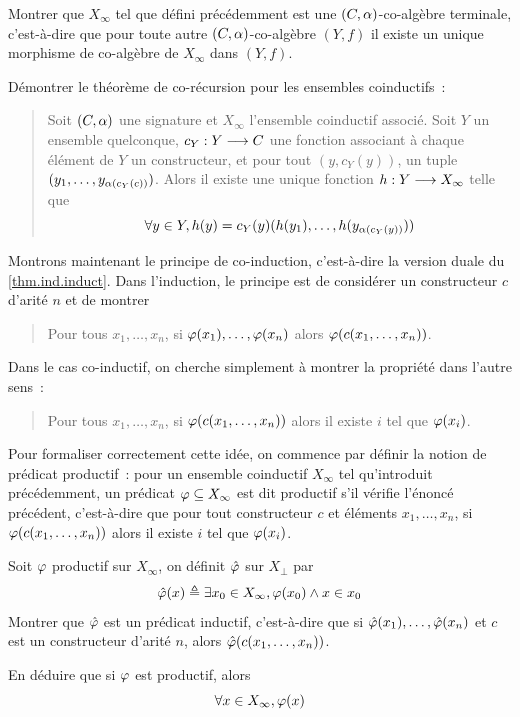 \begin{problem}[La coinduction]
  \begin{pbQuest}[resume]
  \item Montrer que $X_\infty$ tel que défini précédemment est une
    $(C,\alpha)$-co-algèbre terminale, c'est-à-dire que pour toute autre
    $(C,\alpha)$-co-algèbre $(Y,f)$ il existe un unique morphisme de
    co-algèbre de $X_\infty$ dans $(Y,f)$.
  \item Démontrer le théorème de co-récursion pour les ensembles coinductifs~:
    \begin{quotation}
      \noindent
      Soit $(C,\alpha)$ une signature et $X_\infty$ l'ensemble coinductif
      associé. Soit $Y$ un ensemble quelconque,
      $c_Y : \displaystyle Y \longrightarrow C$ une fonction
      associant à chaque élément de $Y$ un constructeur, et pour tout
      $(y,c_Y(y))$, un tuple $(y_1,\ldots,y_{\alpha(c_Y(c))})$.
      Alors il existe une unique fonction $h : \displaystyle Y \longrightarrow X_\infty$
      telle que
      \[\forall y \in Y, h(y) = c_Y(y)(h(y_1),\ldots,h(y_{\alpha(c_Y(y))}))\]
    \end{quotation}
  \end{pbQuest}

  Montrons maintenant le principe de co-induction, c'est-à-dire la version
  duale du \cref{thm.ind.induct}. Dans l'induction, le principe est de
  considérer un constructeur $c$ d'arité $n$ et de montrer
  \begin{quotation}
    \noindent
    Pour tous $x_1,\ldots,x_n$, si $\varphi(x_1),\ldots,\varphi(x_n)$ alors
    $\varphi(c(x_1,\ldots,x_n))$.
  \end{quotation}
  Dans le cas co-inductif, on cherche simplement à montrer la propriété
  \og dans l'autre sens\fg~:
  \begin{quotation}
    \noindent
    Pour tous $x_1,\ldots,x_n$, si $\varphi(c(x_1,\ldots,x_n))$ alors il existe
    $i$ tel que $\varphi(x_i)$.
  \end{quotation}
  Pour formaliser correctement cette idée, on commence par définir la notion
  de prédicat productif~: pour un ensemble coinductif $X_\infty$ tel
  qu'introduit précédemment, un prédicat $\varphi\subseteq X_\infty$ est dit
  productif s'il vérifie l'énoncé précédent, c'est-à-dire que pour tout
  constructeur $c$ et éléments $x_1,\ldots,x_n$, si
  $\varphi(c(x_1,\ldots,x_n))$ alors il existe $i$ tel que $\varphi(x_i)$.
  \begin{pbQuest}[resume]
  \item Soit $\varphi$ productif sur $X_\infty$, on définit $\hat{\varphi}$
    sur $X_\bot$ par
    \[ \hat{\varphi}(x) \triangleq \exists x_0 \in X_\infty,\varphi(x_0)
    \land x \in x_0\]
    Montrer que $\hat{\varphi}$ est un prédicat inductif, c'est-à-dire que
    si $\hat{\varphi}(x_1),\ldots,\hat{\varphi}(x_n)$ et $c$ est un
    constructeur d'arité $n$, alors $\hat{\varphi}(c(x_1,\ldots,x_n))$.
  \item En déduire que si $\varphi$ est productif, alors
    \[\forall x \in X_\infty, \varphi(x)\]
  \end{pbQuest}
  

\end{problem}
